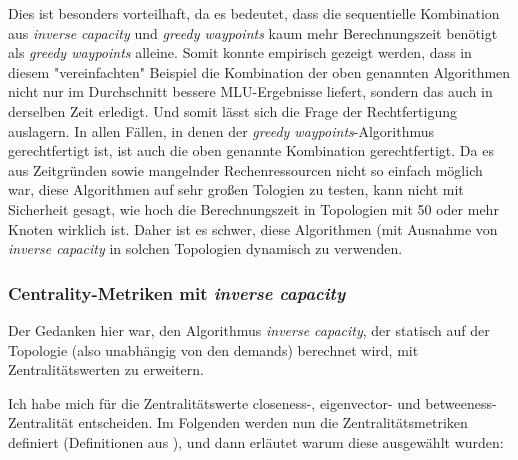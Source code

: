 \documentclass[sigconf, nonacm, review]{acmart}
\begin{document}
Dies ist besonders vorteilhaft, da es bedeutet, 
dass die sequentielle Kombination aus \emph{inverse capacity} und \emph{greedy waypoints} kaum mehr Berechnungszeit ben\"otigt als \emph{greedy waypoints} alleine.
Somit konnte empirisch gezeigt werden, 
dass in diesem "vereinfachten" Beispiel die Kombination der oben genannten Algorithmen nicht nur im Durchschnitt bessere MLU-Ergebnisse liefert, 
sondern das auch in derselben Zeit erledigt.
Und somit l\"asst sich die Frage der Rechtfertigung auslagern.
In allen F\"allen, in denen der \emph{greedy waypoints}-Algorithmus gerechtfertigt ist,
ist auch die oben genannte Kombination gerechtfertigt.\newline
Da es aus Zeitgr\"unden sowie mangelnder Rechenressourcen nicht so einfach m\"oglich war,
diese Algorithmen auf sehr gro\ss en Tologien zu testen,
kann nicht mit Sicherheit gesagt, wie hoch die Berechnungszeit in Topologien mit 50 oder mehr Knoten wirklich ist.
Daher ist es schwer, diese Algorithmen (mit Ausnahme von \emph{inverse capacity} in solchen Topologien dynamisch zu verwenden.
\subsubsection{Centrality-Metriken mit \emph{inverse capacity}}
Der Gedanken hier war, den Algorithmus \emph{inverse capacity}, der statisch auf der Topologie (also unabh\"angig von den demands) berechnet wird, mit Zentralit\"atswerten zu erweitern.

Ich habe mich f\"ur die Zentralit\"atswerte closeness-, eigenvector- und betweeness-Zentralit\"at entscheiden.
Im Folgenden werden nun die Zentralit\"atsmetriken definiert (Definitionen aus \cite{guide}), und dann erl\"autet warum diese ausgew\"ahlt wurden:
\end{document}
